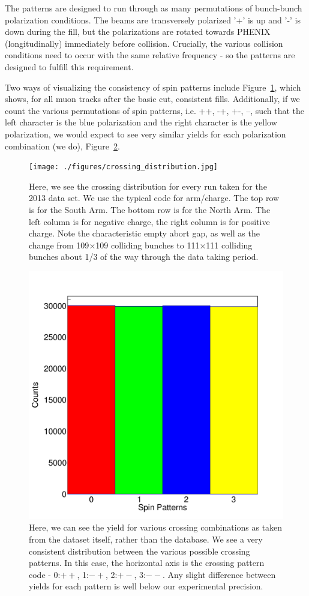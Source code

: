 The patterns are designed to run through as many permutations of bunch-bunch
polarization conditions. The beams are transversely polarized '+' is up and '-'
is down during the fill, but the polarizations are rotated towards PHENIX
(longitudinally) immediately before collision. Crucially, the various collision
conditions need to occur with the same relative frequency - so the patterns are
designed to fulfill this requirement.

Two ways of visualizing the consistency of spin patterns include
Figure~\ref{fig:crossing_count}, which shows, for all muon tracks after the
basic cut, consistent fills. Additionally, if we count the various permutations
of spin patterns, i.e. ++, -+, +-, --, such that the left character is the blue
polarization and the right character is the yellow polarization, we would expect
to see very similar yields for each polarization combination (we do),
Figure~\ref{fig:polarization_counts}.

\begin{figure}
  \centering
  \texttt{[image: ./figures/crossing\_distribution.jpg]}
  \caption{
    Here, we see the crossing distribution for every run taken for the 2013 data
    set. We use the typical code for arm/charge. The top row is for the South
    Arm. The bottom row is for the North Arm. The left column is for negative
    charge, the right column is for positive charge. Note the characteristic
    empty abort gap, as well as the change from 109$\times$109 colliding bunches
    to 111$\times$111 colliding bunches about 1/3 of the way through the data
    taking period.
  }
  \label{fig:crossing_count}
\end{figure}

\begin{figure}
  \centering
  \includegraphics[width=0.6\linewidth]{./figures/crossing_pattenr_count.jpg}
  \caption{
    Here, we can see the yield for various crossing combinations as taken from
    the dataset itself, rather than the database. We see a very consistent
    distribution between the various possible crossing patterns. In this case,
    the horizontal axis is the crossing pattern code - 0:$++$, 1:$-+$, 2:$+-$,
    3:$--$. Any slight difference between yields for each pattern is well below
    our experimental precision.
  }
  \label{fig:polarization_counts}
\end{figure}

